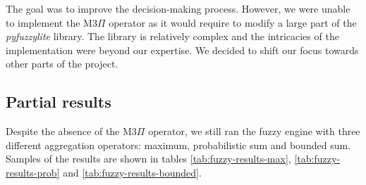 The goal was to improve the decision-making process. However, we were unable to implement the M3$\Pi$ operator as it
would require to modify a large part of the \textit{pyfuzzylite} library. The library is relatively complex and the
intricacies of the implementation were beyond our expertise. We decided to shift our focus towards other parts of
the project.

\subsection{Partial results}
\label{subsec:fuzzy-results}

Despite the absence of the M3$\Pi$ operator, we still ran the fuzzy engine with three different aggregation operators:
maximum, probabilistic sum and bounded sum. Samples of the results are shown in tables \ref{tab:fuzzy-results-max},
\ref{tab:fuzzy-results-prob} and \ref{tab:fuzzy-results-bounded}.

